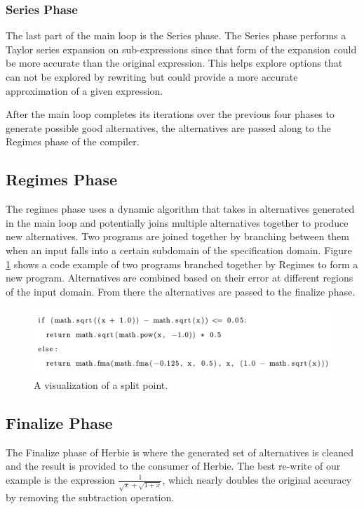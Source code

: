 \documentclass{article}
\begin{document}
\subsubsection{Series Phase}
The last part of the main loop is the Series phase. The Series phase performs a Taylor series expansion on sub-expressions since that form of the expansion could be more accurate than the original expression. This helps explore options that can not be explored by rewriting but could provide a more accurate approximation of a given expression.

After the main loop completes its iterations over the previous four phases to generate possible good alternatives, the alternatives are passed along to the Regimes phase of the compiler.

\subsection{Regimes Phase}

The regimes phase uses a dynamic algorithm that takes in alternatives generated in the main loop and potentially joins multiple alternatives together to produce new alternatives. Two programs are joined together by branching between them when an input falls into a certain subdomain of the specification domain. Figure \ref{fig:python} shows a code example of two programs branched together by Regimes to form a new program. Alternatives are combined based on their error at different regions of the input domain. From there the alternatives are passed to the finalize phase.

\begin{figure}[htbp]
\begin{center}
\includegraphics[scale=0.60]{python-regime.png}
\caption{A visualization of a split point.}
\label{fig:python}
\end{center}
\end{figure}

\subsection{Finalize Phase}
The Finalize phase of Herbie is where the generated set of alternatives is cleaned and the result is provided to the consumer of Herbie. The best re-write of our example is the expression $\frac{1}{\sqrt{x} + \sqrt{1 + x}}$, which nearly doubles the original accuracy by removing the subtraction operation.
\end{document}
